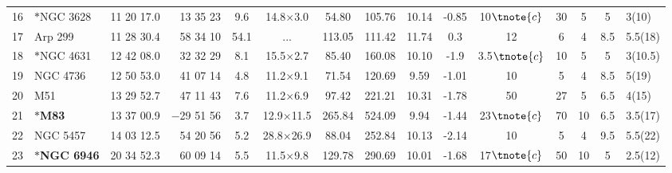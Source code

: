 \begin{table*}
\begin{threeparttable}[b]
\begin{tabular}{llrrccccccccccl}
16 & $\ast$NGC 3628 & 11 20 17.0 & 13 35 23 & 9.6 & 14.8$\times$3.0 & 54.80 & 105.76 & 10.14 & -0.85 & 10$\tnote{c}$ & 30 & 5 & 5 & 3(10) \\
17 & Arp 299 & 11 28 30.4 & 58 34 10 & 54.1 & ... & 113.05 & 111.42 & 11.74 & 0.3 & 12 & 6 & 4 & 8.5 & 5.5(18) \\
18 & $\ast$NGC 4631 & 12 42 08.0 & 32 32 29 & 8.1 & 15.5$\times$2.7 & 85.40 & 160.08 & 10.10 & -1.9 & 3.5$\tnote{c}$ & 10 & 5 & 5 & 3(10.5) \\
19 & NGC 4736 & 12 50 53.0 & 41 07 14 & 4.8 & 11.2$\times$9.1 & 71.54 & 120.69 & 9.59 & -1.01 & 10 & 5 & 4 & 8.5 & 5(19) \\
20 & M51 & 13 29 52.7 & 47 11 43 & 7.6 & 11.2$\times$6.9 & 97.42 & 221.21 & 10.31 & -1.78 & 50 & 27 & 5 & 6.5 & 4(15) \\
21 & $\ast${\bf M83} & 13 37 00.9 & $-$29 51 56 & 3.7 & 12.9$\times$11.5 & 265.84 & 524.09 & 9.94 & -1.44 & 23$\tnote{c}$ & 70 & 10 & 6.5 & 3.5(17) \\
22 & NGC 5457 & 14 03 12.5 & 54 20 56 & 5.2 & 28.8$\times$26.9 & 88.04 & 252.84 & 10.13 & -2.14 & 10 & 5 & 4 & 9.5 & 5.5(22) \\
23 & $\ast${\bf NGC 6946} & 20 34 52.3 & 60 09 14 & 5.5 & 11.5$\times$9.8 & 129.78 & 290.69 & 10.01 & -1.68 & 17$\tnote{c}$ & 50 & 10 & 5 & 2.5(12) \\

\hline
\end{tabular}

\begin{tablenotes}


\end{tablenotes}
\end{threeparttable}
\end{table*}
